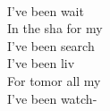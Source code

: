   \\
I've been wait \\
In the sha for my  \\
I've been search \\
I've been liv \\
For tomor all my  \\
I've been watch-
